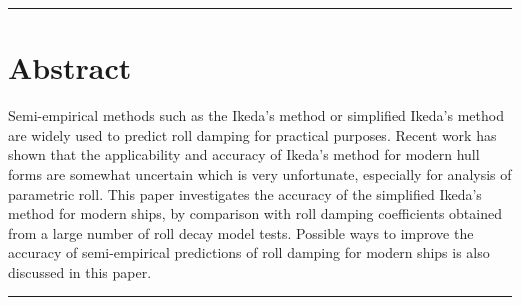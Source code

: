 {\footnotesize
\noindent\rule{\columnwidth}{0.4pt}
\section*{Abstract}\label{se:abstract}
Semi-empirical methods such as the Ikeda’s method or simplified Ikeda’s method are widely used to predict roll damping for practical purposes. Recent work has shown that the applicability and accuracy of Ikeda’s method for modern hull forms are somewhat uncertain which is very unfortunate, especially for analysis of parametric roll. 
This paper investigates the accuracy of the simplified Ikeda's method for modern ships, by comparison with roll damping coefficients obtained from a large number of roll decay model tests. Possible ways to improve the accuracy of semi-empirical predictions of roll damping for modern ships is also discussed in this paper.

}
\newline
\noindent\rule{\columnwidth}{0.4pt}